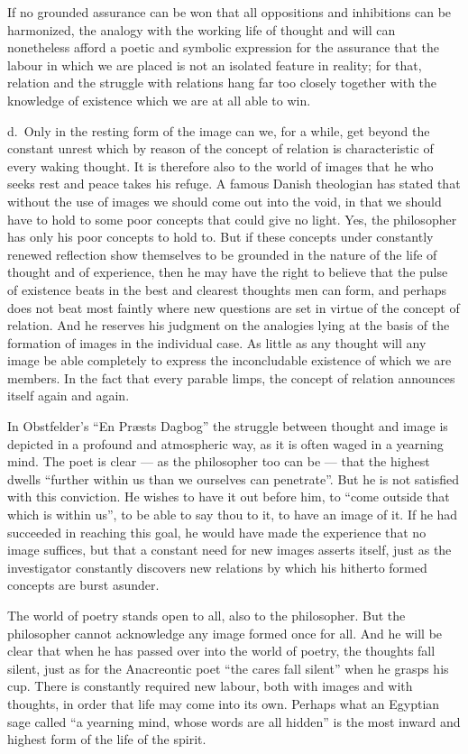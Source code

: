\documentclass[12pt]{article}
\newcommand{\opage}[1]{\marginnote{\footnotesize\textit{[#1]}}}
\begin{document}
\opage{107}If no grounded assurance can be won that all oppositions and inhibitions can
be harmonized, the analogy with the working life of thought and will can
nonetheless afford a poetic and symbolic expression for the assurance that
the labour in which we are placed is not an isolated feature in reality; for
that, relation and the struggle with relations hang far too closely together
with the knowledge of existence which we are at all able to win.

d.~Only in the resting form of the image can we, for a while, get beyond the
constant unrest which by reason of the concept of relation is characteristic
of every waking thought. It is therefore also to the world of images that he
who seeks rest and peace takes his refuge. A famous Danish theologian has
stated that without the use of images we should come out into the void, in
that we should have to hold to some poor concepts that could give no light.
Yes, the philosopher has only his poor concepts to hold to. But if these
concepts under constantly renewed reflection show themselves to be grounded
in the nature of the life of thought and of experience, then he may have the
right to believe that the pulse of existence beats in the best and clearest
thoughts men can form, and perhaps does not beat most faintly where new
questions are set in virtue of the concept of relation. And he reserves his
judgment on the analogies lying at the basis of the formation of images in
the individual case. As little as any thought will any image be able
completely to express the inconcludable existence of which we are members.
In the fact that every parable limps, the concept of relation announces
itself again and again.

In Obstfelder's ``En Præsts Dagbog'' the struggle between thought and image
is depicted in a profound and atmospheric way, as it is often waged in a
yearning mind. The poet is clear --- as the philosopher too can be --- \opage{108}that
the highest dwells ``further within us than we ourselves can penetrate''.
But he is not satisfied with this conviction. He wishes to have it out
before him, to ``come outside that which is within us'', to be able to say
thou to it, to have an image of it. If he had succeeded in reaching this
goal, he would have made the experience that no image suffices, but that a
constant need for new images asserts itself, just as the investigator
constantly discovers new relations by which his hitherto formed concepts are
burst asunder.

The world of poetry stands open to all, also to the philosopher. But the
philosopher cannot acknowledge any image formed once for all. And he will be
clear that when he has passed over into the world of poetry, the thoughts
fall silent, just as for the Anacreontic poet ``the cares fall silent'' when
he grasps his cup. There is constantly required new labour, both with images
and with thoughts, in order that life may come into its own. Perhaps what an
Egyptian sage called ``a yearning mind, whose words are all hidden'' is the
most inward and highest form of the life of the spirit.
\end{document}
